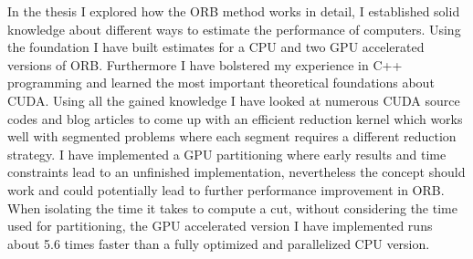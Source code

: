 \documentclass[]{article}
\begin{document}
In the thesis I explored how the ORB method works in detail, I established solid knowledge about different ways to estimate the performance of computers. Using the foundation I have built estimates for a CPU and two GPU accelerated versions of ORB. Furthermore I have bolstered my experience in C++ programming and learned the most important theoretical foundations about CUDA. Using all the gained knowledge I have looked at numerous CUDA source codes and blog articles to come up with an efficient reduction kernel which works well with segmented problems where each segment requires a different reduction strategy. I have implemented a GPU partitioning where early results and time constraints lead to an unfinished implementation, nevertheless the concept should work and could potentially lead to further performance improvement in ORB. 
When isolating the time it takes to compute a cut, without considering the time used for partitioning, the GPU accelerated version I have implemented runs about 5.6 times faster than a fully optimized and parallelized CPU version. 
 


%
\newpage



\listoffigures
\listoftables
\end{document}
